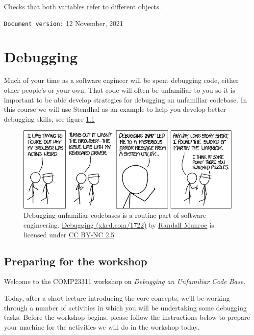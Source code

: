\documentclass[
]{book}
\begin{document}
Checks that both variables refer to different objects.

\texttt{Document\ version:} 12 November, 2021

\hypertarget{debugging}{%
\chapter{Debugging}\label{debugging}}

Much of your time as a software engineer will be spent debugging code, either other people's or your own. That code will often be unfamiliar to you so it is important to be able develop strategies for debugging an unfamiliar codebase. In this course we will use Stendhal as an example to help you develop better debugging skills, see figure \ref{fig:xkcd-debugging-fig}

\begin{figure}

{\centering \includegraphics[width=0.99\linewidth]{images/debugging} 

}

\caption{Debugging unfamiliar codebases is a routine part of software engineering. \href{https://xkcd.com/1722/}{Debugging (xkcd.com/1722)} by \href{https://en.wikipedia.org/wiki/Randall_Munroe}{Randall Munroe} is licensed under \href{https://creativecommons.org/licenses/by-nc/2.5/}{CC BY-NC 2.5}}\label{fig:xkcd-debugging-fig}
\end{figure}



\hypertarget{preparing-for-the-workshop}{%
\section{Preparing for the workshop}\label{preparing-for-the-workshop}}

Welcome to the COMP23311 workshop on \emph{Debugging an Unfamiliar Code Base}.

Today, after a short lecture introducing the core concepts, we'll be working through a number of activities in which you will be undertaking some debugging tasks. Before the workshop begins, please follow the instructions below to prepare your machine for the activities we will do in the workshop today.
\end{document}
